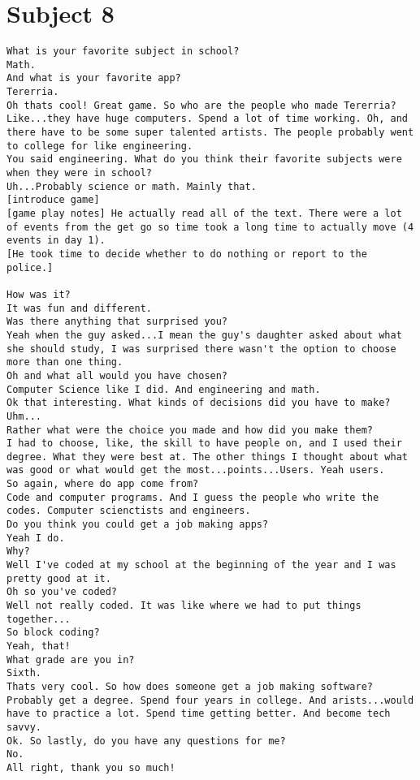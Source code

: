 \clearpage\section*{Subject 8}
\begin{lstlisting}
What is your favorite subject in school?
Math.
And what is your favorite app?
Tererria.
Oh thats cool! Great game. So who are the people who made Tererria?
Like...they have huge computers. Spend a lot of time working. Oh, and there have to be some super talented artists. The people probably went to college for like engineering.
You said engineering. What do you think their favorite subjects were when they were in school?
Uh...Probably science or math. Mainly that.
[introduce game]
[game play notes] He actually read all of the text. There were a lot of events from the get go so time took a long time to actually move (4 events in day 1).
[He took time to decide whether to do nothing or report to the police.]

How was it?
It was fun and different.
Was there anything that surprised you?
Yeah when the guy asked...I mean the guy's daughter asked about what she should study, I was surprised there wasn't the option to choose more than one thing.
Oh and what all would you have chosen?
Computer Science like I did. And engineering and math.
Ok that interesting. What kinds of decisions did you have to make?
Uhm...
Rather what were the choice you made and how did you make them?
I had to choose, like, the skill to have people on, and I used their degree. What they were best at. The other things I thought about what was good or what would get the most...points...Users. Yeah users.
So again, where do app come from?
Code and computer programs. And I guess the people who write the codes. Computer scienctists and engineers.
Do you think you could get a job making apps?
Yeah I do.
Why?
Well I've coded at my school at the beginning of the year and I was pretty good at it.
Oh so you've coded?
Well not really coded. It was like where we had to put things together...
So block coding?
Yeah, that!
What grade are you in?
Sixth.
Thats very cool. So how does someone get a job making software?
Probably get a degree. Spend four years in college. And arists...would have to practice a lot. Spend time getting better. And become tech savvy.
Ok. So lastly, do you have any questions for me?
No.
All right, thank you so much!
\end{lstlisting}

